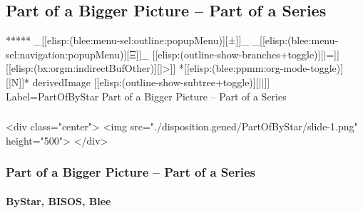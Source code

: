 \begin{whenOrg}
\section{Part of a Bigger Picture -- Part of a Series}

\begin{whenOrg}
*****  _[[elisp:(blee:menu-sel:outline:popupMenu)][±]]_ _[[elisp:(blee:menu-sel:navigation:popupMenu)][Ξ]]_ [[elisp:(outline-show-branches+toggle)][|=]] [[elisp:(bx:orgm:indirectBufOther)][|>]] *[[elisp:(blee:ppmm:org-mode-toggle)][|N]]*  derivedImage [[elisp:(outline-show-subtree+toggle)][||]] Label=PartOfByStar Part of a Bigger Picture -- Part of a Series
\end{whenOrg}

\begin{htmlonly}

\begin{frame}[fragile,plain,label=PartOfByStar]
    \frametitle{}
    \framesubtitle{}
    \begin{rawhtml}
<div class="center">
<img src="./disposition.gened/PartOfByStar/slide-1.png" height="500">
</div>
    \end{rawhtml}
\end{frame}
\end{htmlonly}

\begin{verblatex}

\begin{frame}[fragile,plain,label=PartOfByStar]
    \frametitle{Part of a Bigger Picture -- Part of a Series}
    \framesubtitle{ByStar, BISOS, Blee}


\end{frame}
\end{verblatex}
\end{whenOrg}
